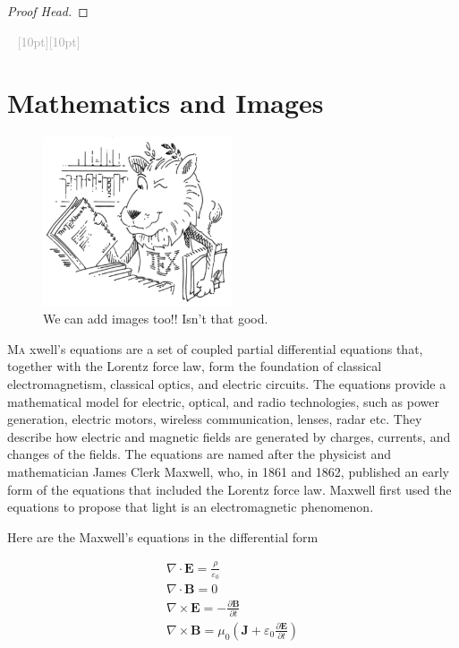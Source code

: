 \documentclass{package/fancy-book}
\newcommand{\ornamento}{\vspace{2em}\noindent \textcolor{darkgray}{\hrulefill~ \raisebox{-2.5pt}[10pt][10pt]{\leafright \decofourleft 
\decothreeleft  \aldineright \decotwo \floweroneleft \decoone   \floweroneright 
\decotwo \aldineleft\decothreeright \decofourright \leafleft} ~  \hrulefill \\ \vspace{2em}}}
\begin{document}
\begin{problem}%
	\lipsum[1][1-3] %
\end{problem}
\begin{proof}[Proof Head]
	\lipsum[1][1-10] %
\end{proof}
\nocite{knuthwebsite}

\ornamento

\section{Mathematics and Images}
\begin{figure}[H]
	\centering
	\includegraphics[height = 0.4\textwidth, width = 0.5\textwidth]{resource/ctan_lion.png}
	\caption{We can add images too!! Isn't that good.}
	\label{img:anything}
\end{figure}
\lettrine{M}{a} xwell's equations are a set of coupled partial differential equations that, together with the Lorentz force law, form the foundation of classical electromagnetism, 
classical optics, and electric circuits. The equations provide a mathematical model for electric, optical, and radio technologies, 
such as power generation, electric motors, wireless communication, lenses, radar etc. They describe how electric and magnetic fields are generated by charges, currents, and changes of the fields.
The equations are named after the physicist and mathematician James Clerk Maxwell, who, in 1861 and 1862, published an early form of the equations that included 
  the Lorentz force law. Maxwell first used the equations to propose that light is an electromagnetic phenomenon. 

  Here are the Maxwell's equations in the differential form

\[
\begin{gathered}
	\nabla \cdot \mathbf {E} ={\frac {\rho }{\varepsilon _{0}}} \\
	 \nabla \cdot \mathbf {B} ={0} \\ \tag*{(1)}
	\nabla \times \mathbf {E} =-{\frac {\partial \mathbf {B} }{\partial t}}\\
	 \nabla \times \mathbf {B} =\mu _{0}\left(\mathbf {J} +\varepsilon _{0}{\frac {\partial \mathbf {E} }{\partial t}}\right)
\end{gathered}
\]
\vspace*{2pt}
\lipsum[1][1-20]

\pagebreak

\medskip

\printbibliography[heading=bibintoc,title={\centering Bibliography}]
\end{document}
